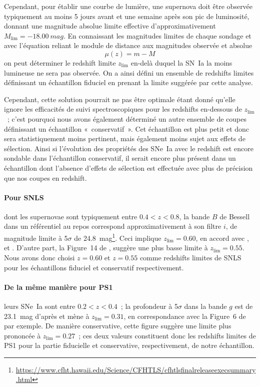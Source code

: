 \documentclass[../main/main.tex]{subfiles}
\begin{document}
Cependant, pour établir une courbe de lumière, une supernova doit être observée
typiquement au moins 5 jours avant et une semaine après son pic de luminosité,
donnant une magnitude absolue limite effective d'approximativement $M_{\lim}
= \SI{-18.00}{mag}$. En connaissant les magnitudes limites de chaque sondage et
avec l'équation reliant le module de distance aux magnitudes observée et
absolue
\begin{equation}\label{eq:distmod}
    \mu(z) = m - M
\end{equation}
on peut déterminer le redshift limite $z_{\lim}$ en-delà duquel la SN~Ia la
moins lumineuse ne sera pas observée. On a ainsi défini un ensemble de redshifts
limites définissant un échantillon fiduciel en prenant la limite suggérée par
cette analyse.

Cependant, cette solution pourrait ne pas être optimale étant donné qu'elle
ignore les efficacités de suivi spectroscopiques pour les redshifts en-dessous
de $z_{\lim}$~; c'est pourquoi nous avons également déterminé un autre ensemble
de coupes définissant un échantillon «~conservatif~». Cet échantillon est plus
petit et donc sera statistiquement moins pertinent, mais également moins sujet
aux effets de sélection. Ainsi si l'évolution des propriétés des SNe~Ia avec le
redshift est encore sondable dans l'échantillon conservatif, il serait encore
plus présent dans un échantillon dont l'absence d'effets de sélection est
effectuée avec plus de précision que nos coupes en redshift.

\paragraph*{Pour SNLS} dont les supernovae sont typiquement entre $0.4 < z <
0.8$, la bande $B$ de Bessell dans un référentiel au repos correspond
approximativement à son filtre $i$, de magnitude limite à 5$\sigma$ de
\SI{24.8}{mag}\footnote{\href{
    https://www.cfht.hawaii.edu/Science/CFHTLS/cfhtlsfinalreleaseexecsummary.html}
{https://www.cfht.hawaii.edu/Science/CFHTLS/cfhtlsfinalreleaseexecsummary.html}}.
Ceci implique $z_{\lim} = 0.60$, en accord avec \cite{neill2006, perrett2010},
et \cite{bazin2011}. D'autre part, la Figure~14 de \cite{perrett2010}, suggère
une plus basse limite à $z_{\lim} = 0.55$. Nous avons donc choisi $z=0.60$ et
$z=0.55$ comme redshifts limites de SNLS pour les échantillons fiduciel et
conservatif respectivement.

\paragraph*{De la même manière pour PS1} leurs SNe~Ia sont entre $0.2 < z <
0.4$~; la profondeur à 5$\sigma$ dans la bande $g$ est de \SI{23.1}{mag} d'après
\cite{rest2014} et mène à $z_{\lim}=0.31$, en correspondance avec la Figure~6
de \cite{scolnic2018} par exemple. De manière conservative, cette figure
suggère une limite plus prononcée à $z_{\lim}=0.27$~; ces deux valeurs
constituent donc les redshifts limites de PS1 pour la partie fiducielle et
conservative, respectivement, de notre échantillon.
\end{document}
